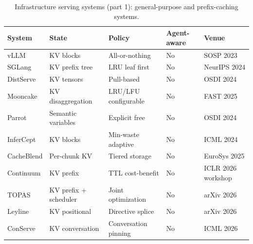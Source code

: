 \documentclass[preprint,12pt]{elsarticle}
\begin{document}
\begin{table}[!tbp]
\centering
\caption{Infrastructure serving systems (part 1): general-purpose and prefix-caching systems.}
\label{tab:v5_4}
\begingroup
\setlength{\tabcolsep}{4pt}
\renewcommand{\arraystretch}{1.13}
\footnotesize
\begin{tabular}{@{}Y{.145\linewidth}Y{.225\linewidth}Y{.260\linewidth}Y{.120\linewidth}Y{.125\linewidth}@{}}
\toprule
\textbf{System} & \textbf{State} & \textbf{Policy} & \textbf{Agent-aware} & \textbf{Venue} \\
\midrule
vLLM & KV blocks & All-or-nothing & No & SOSP 2023 \\
SGLang & KV prefix tree & LRU leaf first & No & NeurIPS 2024 \\
DistServe & KV tensors & Pull-based & No & OSDI 2024 \\
Mooncake & KV disaggregation & LRU/LFU configurable & No & FAST 2025 \\
Parrot & Semantic variables & Explicit free & No & OSDI 2024 \\
InferCept & KV blocks & Min-waste adaptive & No & ICML 2024 \\
CacheBlend & Per-chunk KV & Tiered storage & No & EuroSys 2025 \\
Continuum & KV prefix & TTL cost-benefit & No & ICLR 2026 workshop \\
TOPAS & KV prefix + scheduler & Joint optimization & No & arXiv 2026 \\
Leyline\cite{v5supp3} & KV positional & Directive splice & No & arXiv 2026 \\
ConServe\cite{v5supp6} & KV conversation & Conversation pinning & No & ICML 2026 \\
\bottomrule
\end{tabular}
\endgroup
\end{table}
\end{document}
